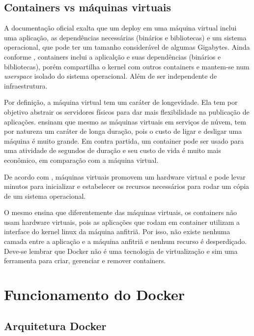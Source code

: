 \documentclass[
	12pt,				%
	openright,			%
	oneside,			%
	a4paper,			%
	chapter=TITLE,		%
	section=TITLE,		%
	english,			%
	french,				%
	spanish,			%
	brazil				%
	]{abntex2}
\begin{document}
\subsection{Containers vs máquinas virtuais}

A documentação oficial exalta que um deploy em uma máquina virtual inclui uma aplicação, as dependências necessárias (binários e bibliotecas) e um sistema operacional, que pode ter um tamanho considerável de algumas Gigabytes. Ainda conforme , containers inclui a aplicalção e suas dependências (binários e bibliotecas), porém compartilha o kernel com outros containers e mantem-se num \textit{userspace} isolado do sistema operacional. Além de ser independente de infraestrutura.

Por definição, a máquina virtual tem um caráter de longevidade. Ela tem por objetivo abstrair os servidores físicos para dar mais flexibilidade na publicação de aplicações.  ensinam que mesmo as máquinas virtuais em serviços de núvem, tem por natureza um caráter de longa duração, pois o custo de ligar e desligar uma máquina é muito grande. Em contra partida, um container pode ser usado para uma atividade de segundos de duração e seu custo de vida é muito mais econômico, em comparação com a máquina virtual.

De acordo com , máquinas virtuais promovem um hardware virtual e pode levar minutos para inicializar e estabelecer os recursos necessários para rodar um cópia de um sistema operacional.

O mesmo  ensina que diferentemente das máquinas virtuais, os containers não usam hardware virtuais, pois as aplicações que rodam em container utilizam a interface do kernel linux da máquina anfitriã. Por isso, não existe nenhuma camada entre a aplicação e a máquina anfitriã e nenhum recurso é desperdiçado. Deve-se lembrar que Docker não é uma tecnologia de virtualização e sim uma ferramenta para criar, gerenciar e remover containers.

\section{Funcionamento do Docker}

\subsection{Arquitetura Docker}
\end{document}
